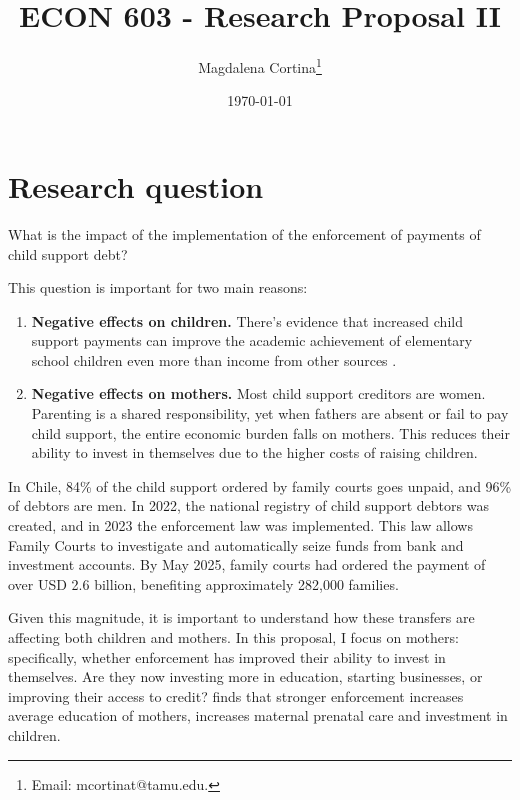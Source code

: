





	
\title{\Large \textbf{ECON 603 - Research Proposal II}}
\author{Magdalena Cortina\thanks{Email: mcortinat@tamu.edu.}} 
\date{\today}

\maketitle
\thispagestyle{empty} 
\doublespacing
\thispagestyle{empty} 

\vspace{-10mm}

\doublespacing

\section{ Research question}

\noindent What is the impact of the implementation of the enforcement of payments of child support debt?

This question is important for two main reasons:

\begin{enumerate}
    \item \textbf{Negative effects on children.} There's evidence that increased child support payments can improve the academic achievement of elementary school children even more than income from other sources \citet{knox_effects_1996, nepomnyaschy_child_2012}. 
    
    \item \textbf{Negative effects on mothers.} Most child support creditors are women. Parenting is a shared responsibility, yet when fathers are absent or fail to pay child support, the entire economic burden falls on mothers. This reduces their ability to invest in themselves due to the higher costs of raising children.
\end{enumerate}

In Chile, 84\% of the child support ordered by family courts goes unpaid, and 96\% of debtors are men. In 2022, the national registry of child support debtors was created, and in 2023 the enforcement law was implemented. This law allows Family Courts to investigate and automatically seize funds from bank and investment accounts. By May 2025, family courts had ordered the payment of over USD 2.6 billion, benefiting approximately 282,000 families.

Given this magnitude, it is important to understand how these transfers are affecting both children and mothers. In this proposal, I focus on mothers: specifically, whether enforcement has improved their ability to invest in themselves. Are they now investing more in education, starting businesses, or improving their access to credit? \citet{aizer_impact_2005} finds that stronger enforcement increases average education of mothers, increases maternal prenatal care and investment in children.

